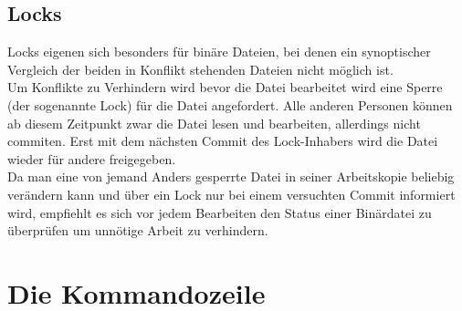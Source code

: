 \subsection{Locks}
Locks eigenen sich besonders für binäre Dateien, bei denen ein synoptischer Vergleich der beiden in Konflikt stehenden Dateien nicht möglich ist.\\
Um Konflikte zu Verhindern wird bevor die Datei bearbeitet wird eine Sperre (der sogenannte Lock) für die Datei angefordert. Alle anderen Personen können ab diesem Zeitpunkt zwar die Datei lesen und bearbeiten, allerdings nicht commiten. Erst mit dem nächsten Commit des Lock-Inhabers wird die Datei wieder für andere freigegeben.\\
Da man eine von jemand Anders gesperrte Datei in seiner Arbeitskopie beliebig verändern kann und über ein Lock nur bei einem versuchten Commit informiert wird, empfiehlt es sich vor jedem Bearbeiten den Status einer Binärdatei zu überprüfen um unnötige Arbeit zu verhindern.

\section{Die Kommandozeile}

